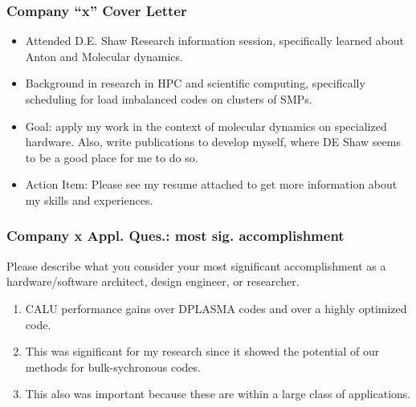 \begin{frame} %
\frametitle{Company ``x'' Cover Letter}
\begin{itemize}
\tiny \item \tiny Attended D.E. Shaw Research information session,
specifically learned about Anton and Molecular dynamics. 
\tiny \item \tiny Background in research in HPC and scientific
computing, specifically scheduling for load imbalanced codes on
clusters of SMPs.

\item \tiny Goal: apply my work in the context of molecular dynamics 
on specialized hardware. Also, write publications to develop myself,
where DE Shaw seems to be a good place for me to do so. 
\item \tiny Action Item: Please see my resume attached to get more
  information about my skills and experiences. 
\end{itemize} 
\end{frame}

\begin{frame}
\frametitle{Company x Appl. Ques.: most sig. accomplishment}
{\tiny Please describe what you consider your most
significant accomplishment as a hardware/software architect, design
engineer, or researcher.}
\begin{enumerate}
\tiny \item \tiny CALU performance gains over DPLASMA codes and over a
highly optimized code. 
\item \tiny This was significant for my research since it showed the
  potential of our methods for bulk-sychronous codes. 
\item \tiny  This also was important because these are within a large
  class of applications. 
\end{enumerate} 
\end{frame}

